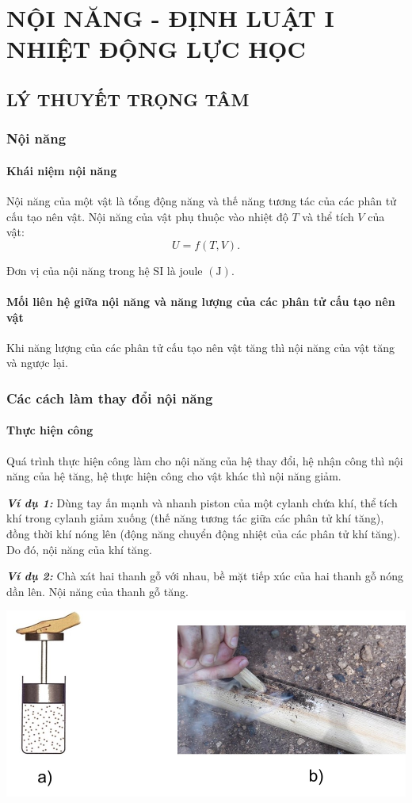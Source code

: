 \section{NỘI NĂNG - ĐỊNH LUẬT I NHIỆT ĐỘNG LỰC HỌC}
\subsection{LÝ THUYẾT TRỌNG TÂM}
\subsubsection{Nội năng}
\paragraph{Khái niệm nội năng}
\begin{boxdn}
	Nội năng của một vật là tổng động năng và thế năng tương tác của các phân tử cấu tạo nên vật. Nội năng của vật phụ thuộc vào nhiệt độ $T$ và thể tích $V$ của vật:
	$$U=f\left(T, V\right).$$
\end{boxdn}
Đơn vị của nội năng trong hệ SI là joule $\left(\si{\joule}\right)$.
\paragraph{Mối liên hệ giữa nội năng và năng lượng của các phân tử cấu tạo nên vật}
Khi năng lượng của các phân tử cấu tạo nên vật tăng thì nội năng của vật tăng và ngược lại.
\subsubsection{Các cách làm thay đổi nội năng}
\paragraph{Thực hiện công}
\begin{boxdn}
	Quá trình thực hiện công làm cho nội năng của hệ thay đổi, hệ nhận công thì nội năng của hệ tăng, hệ thực hiện công cho vật khác thì nội năng giảm.
\end{boxdn}
\begin{boxvidu}
	\textbf{\textit{Ví dụ 1:}} Dùng tay ấn mạnh và nhanh piston của một cylanh chứa khí, thể tích khí trong cylanh giảm xuống (thế năng tương tác giữa các phân tử khí tăng), đồng thời khí nóng lên (động năng chuyển động nhiệt của các phân tử khí tăng). Do đó, nội năng của khí tăng.
\end{boxvidu}
\begin{boxvidu}
	\textbf{\textit{Ví dụ 2:}} Chà xát hai thanh gỗ với nhau, bề mặt tiếp xúc của hai thanh gỗ nóng dần lên. Nội năng của thanh gỗ tăng.
\end{boxvidu}
\begin{center}
	\includegraphics[width=0.45\linewidth	]{figs/VN12-Y24-PH-SYL-003-1}
\end{center}
